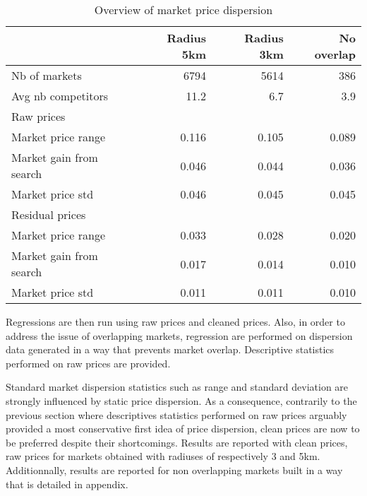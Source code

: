\documentclass[english]{article}
\begin{document}
{{\begin{table}[H]
\caption{Overview of market price dispersion}
\begin{tabular}{lrrr}
\hline
{} & Radius 5km & Radius 3km & No overlap\\
\hline
Nb of markets & 6794 & 5614 & 386 \\
Avg nb competitors & 11.2 & 6.7 & 3.9 \\
\hline
Raw prices & & & \\
\hline
Market price range & 0.116 & 0.105 & 0.089\\
Market gain from search & 0.046 & 0.044 & 0.036 \\
Market price std & 0.046 & 0.045 & 0.045 \\
\hline
Residual prices & & & \\
\hline
Market price range & 0.033  & 0.028 & 0.020 \\
Market gain from search & 0.017 & 0.014 & 0.010 \\
Market price std & 0.011 & 0.011 & 0.010 \\
\hline
\end{tabular}
\end{table}

Regressions are then run using raw prices and cleaned prices. Also, in order to address the issue of overlapping markets, regression are performed on dispersion data generated in a way that prevents market overlap. Descriptive statistics performed on raw prices are provided.

Standard market dispersion statistics such as range and standard deviation are strongly influenced by static price dispersion. As a consequence, contrarily to the previous section where descriptives statistics performed on raw prices arguably provided a most conservative first idea of price dispersion, clean prices are now to be preferred despite their shortcomings. Results are reported with clean prices, raw prices for markets obtained with radiuses of respectively 3 and 5km. Additionnally, results are reported for non overlapping markets built in a way that is detailed in appendix.

}}
\end{document}
